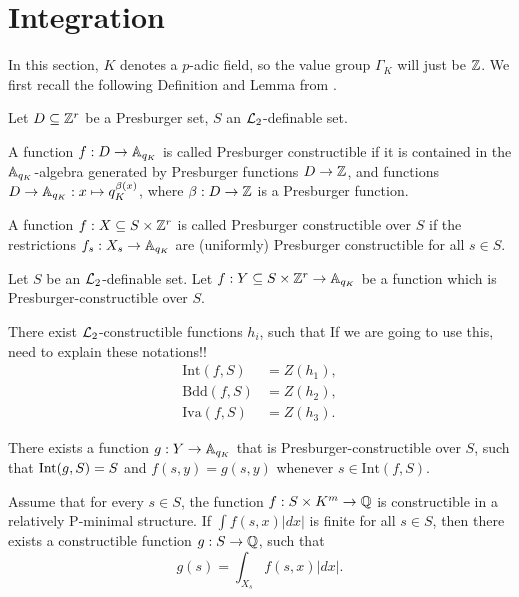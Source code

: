 \section{Integration}
In this section, $K$ denotes a $p$-adic field, so the value group $\Gamma_K$ will just be $\Z$.
We first recall the following Definition and Lemma from \cite{Clu-Gor-Hal-14}.
\begin{defn}Let $D \subseteq \ZZ^r$ be a Presburger set, $S$ an $\Lm_2$-definable set.
\item A function $f: D \to \AA_{q_K}$ is called Presburger constructible if it is contained in the $\AA_{q_K}$-algebra generated by Presburger functions $D\to \ZZ$, and functions $D\to \AA_{q_K}: x \mapsto q_K^{\beta(x)}$, where $\beta:D \to \ZZ$ is a Presburger function.
\item A function $f:X\subseteq S \times \ZZ^r$ is called Presburger constructible over $S$ if  the restrictions $f_s: X_s \to \AA_{q_K}$ are (uniformly) Presburger constructible for all $s \in S$. 

\end{defn}
\begin{lem}\label{lemma:presburgerloci} Let $S$ be an $\Lm_2$-definable set. 
Let $f:Y\subseteq S\times \ZZ^r\to \AA_{q_K}$ be a function which is Presburger-constructible over $S$.
\item There exist $\Lm_2$-constructible functions $h_i$, such that {\color{red} If we are going to use this, need to explain these notations!!}
\begin{align*}
\text{Int}(f,S) &= Z(h_1),\\
\text{Bdd}(f,S) &= Z(h_2),\\
\text{Iva}(f,S) &= Z(h_3).
\end{align*}
\item There exists a function $g: Y \to \AA_{q_K}$ that is Presburger-constructible over $S$, such that $\Int(g,S) = S$ and $f(s,y) = g(s,y)$ whenever $s \in \text{Int}(f,S)$.
\end{lem}
\begin{thm}
Assume that for every $s \in S$, the function $f: S\times K^m \to \QQ$ is constructible in a relatively P-minimal structure. If $\int f(s,x)|dx|$ is finite for all $s \in S$, then there exists a constructible function $g: S \to \QQ$, such that
\[g(s) = \int_{X_s} f(s,x)|dx|.\]
\end{thm}
